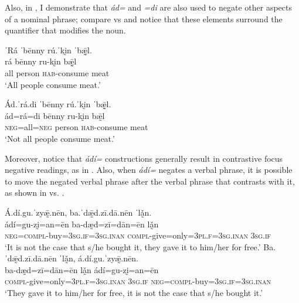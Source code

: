 \documentclass[output=paper,colorlinks=true, citecolor=brown]{langscibook}
\begin{document}
\z 

Also, in , I demonstrate that \textit{ád=} and \textit{=di} are also used to negate other aspects of a nominal phrase; compare  vs  and notice that these elements surround the quantifier that modifies the noun.

\ea\label{ex:zap:78} 
    \glll ˈRá ˈbēnny rú.ˈkḭn ˈbǣ̰̰l.\\ 
         rá bēnny ru-kḭn bǣ̰̰l \\
          all person \textsc{hab}{}-consume meat\\
    \glt ‘All people consume meat.’
\z 

\ea\label{ex:zap:79} 
    \glll Ád.ˈrá.di ˈbēnny rú.ˈkḭn ˈbǣ̰̰l.\\ 
          ád=rá=di bēnny ru-kḭn bǣ̰l\\
          \textsc{neg}=all=\textsc{neg} person \textsc{hab}{}-consume meat\\
    \glt ‘Not all people consume meat.’
\z 

Moreover, notice that \textit{ádí=} constructions generally result in contrastive focus negative readings, as in . Also, when \textit{ádí=} negates a verbal phrase, it is possible to move the negated verbal phrase after the verbal phrase that contrasts with it, as shown in  vs. .

\ea\label{ex:zap:80}
    \ea\label{ex:zap:80a}
        \glll Á.dí.gu.ˈzyǣ̰.nēn, ba.ˈdǣ̰d.zī.dā.nēn ˈlǎ̰n. \\ 
               ádí=gu-zḭ=an=ēn ba-dæ̰d=zī=dān=ēn lǎ̰n\\
               \textsc{neg}=\textsc{compl}{}-buy=\textsc{3sg.if}=\textsc{3sg.inan} \textsc{compl}{}-give=only=\textsc{3pl.f}=3\textsc{sg.inan} \textsc{3sg.if}\\
        \glt  ‘It is not the case that s/he bought it, they gave it to him/her for free.’
    \ex\label{ex:zap:80b}
        \glll  Ba.ˈdǣ̰d.zī.dā.nēn ˈlǎ̰n, á.dí.gu.ˈzyǣ̰.nēn.\\
              ba-dæ̰d=zī=dān=ēn lǎ̰n ádí=gu-zḭ=an=ēn\\
               \textsc{compl}{}-give=only=\textsc{3pl.f}=\textsc{3sg.inan} \textsc{3sg.if} \textsc{neg}=\textsc{compl}{}-buy=\textsc{3sg.if}=\textsc{3sg.inan}\\
        \glt  ‘They gave it to him/her for free, it is not the case that s/he bought it.’
    \z
\z 
\end{document}
